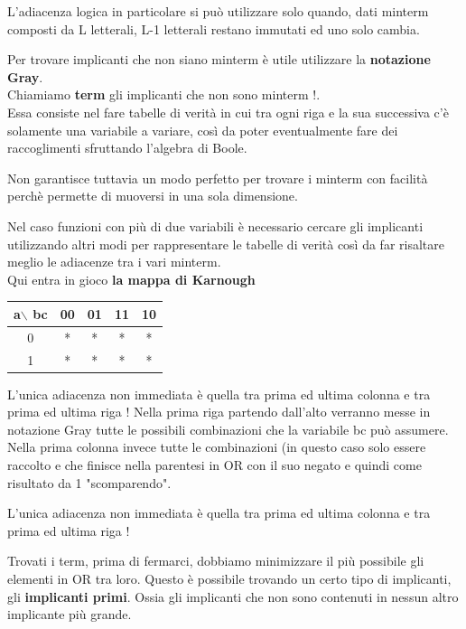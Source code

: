 \documentclass[a4paper]{book}
\begin{document}
L'adiacenza logica in particolare si può utilizzare solo quando, dati minterm composti da L letterali, L-1 letterali restano immutati ed uno solo cambia.

Per trovare implicanti che non siano minterm è utile utilizzare la \textbf{notazione Gray}.\\
Chiamiamo \textbf{term} gli implicanti che non sono minterm !.\\
Essa consiste nel fare tabelle di verità in cui tra ogni riga e la sua successiva c'è solamente una variabile a variare, così da poter eventualmente fare dei raccoglimenti sfruttando l'algebra di Boole.


Non garantisce tuttavia un modo perfetto per trovare i minterm con facilità perchè permette di muoversi in una sola dimensione.

\vspace{\baselineskip}

Nel caso funzioni con più di due variabili è necessario cercare gli implicanti utilizzando altri modi per rappresentare le tabelle di verità così da far risaltare meglio le adiacenze tra i vari minterm.\\
\vspace{\baselineskip}
Qui entra in gioco \textbf{la mappa di Karnough}
\vspace{\baselineskip}
\begin{tabular}{|c|c|c|c|c|}
\hline
a$\backslash$ bc & 00 & 01 & 11 & 10 \\
\hline
0              & *  & *  & *  & *  \\
\hline
1              & *  & *  & *  & *  \\
\hline
\end{tabular}
\vspace{\baselineskip}
L'unica adiacenza non immediata è quella tra prima ed ultima colonna e tra prima ed ultima riga !
Nella prima riga partendo dall'alto verranno messe in notazione Gray tutte le possibili combinazioni che la variabile bc può assumere.
Nella prima colonna invece tutte le combinazioni (in questo caso solo essere raccolto e che finisce nella parentesi in OR con il suo negato e quindi come risultato da 1 
"scomparendo". 

L'unica adiacenza non immediata è quella tra prima ed ultima colonna e tra prima ed ultima riga !

Trovati i term, prima di fermarci, dobbiamo minimizzare il più possibile gli elementi in OR tra loro.
Questo è possibile trovando un certo tipo di implicanti, gli \textbf{implicanti primi}.
Ossia gli implicanti che non sono contenuti in nessun altro implicante più grande.
\newpage
\end{document}
